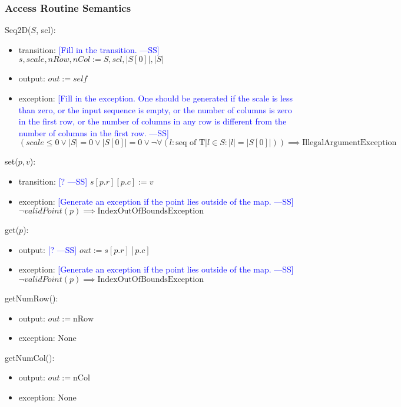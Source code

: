 \documentclass[12pt]{article}
\newcommand{\authornote}[3]{\textcolor{#1}{[#3 ---#2]}}
\newcommand{\authornote}[3]{}
\newcommand{\wss}[1]{\authornote{blue}{SS}{#1}}
\begin{document}
\subsubsection* {Access Routine Semantics}

Seq2D($S$, scl):
\begin{itemize}	
\item transition: \wss{Fill in the transition.}  $s, scale, nRow, nCol:= S, scl,  |S[0]|, |S| $
\item output: $\mathit{out} := \mathit{self}$
\item exception: \wss{Fill in the exception.  One should be generated if the
    scale is less than zero, or the input sequence is empty, or the number of
    columns is zero in the first row, or the number of columns in any row is
    different from the number of columns in the first row.}\\
$(scale \le 0 \lor |S| = 0 \lor |S[0]| = 0 \lor \lnot\forall(l : \mbox{seq of T}|l\in S: |l| = |S[0]|)) \implies \mbox{IllegalArgumentException}$  
\end{itemize}

\noindent set($p, v$):
\begin{itemize}
\item transition: \wss{?} $s[p.r][p.c] := v$
\item exception: \wss{Generate an exception if the point lies outside of the
    map.}\\ 
$\lnot validPoint(p) \implies \mbox{IndexOutOfBoundsException}$
\end{itemize}

\noindent get($p$):
\begin{itemize}
\item output: \wss{?} $out := s[p.r][p.c]$
\item exception: \wss{Generate an exception if the point lies outside of the map.}
$\lnot validPoint(p) \implies \mbox{IndexOutOfBoundsException}$
\end{itemize}

\noindent getNumRow():
\begin{itemize}
\item output: $out := \mbox{nRow}$
\item exception: None
\end{itemize}

\noindent getNumCol():
\begin{itemize}
\item output: $out := \mbox{nCol}$
\item exception: None
\end{itemize}
\end{document}
